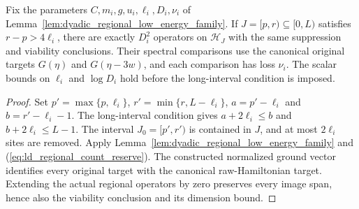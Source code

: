 \begin{lemma}
    \label{lem:dyadic_long_interval_low_energy_family}
    \leanok
    Fix the parameters $C,m_i,g,u_i,\ell_i,D_i,\nu_i$ of
    Lemma~\ref{lem:dyadic_regional_low_energy_family}. If
    $J=[p,r)\subseteq[0,L)$ satisfies $r-p>4\ell_i$, there are exactly
    $D_i^2$ operators on $\mathcal H_J$ with the same suppression and
    viability conclusions. Their spectral comparisons use the canonical
    original targets $G(\eta)$ and $G(\eta-3w)$, and each comparison
    has loss $\nu_i$. The scalar bounds on $\ell_i$ and $\log D_i$
    hold before the long-interval condition is imposed.
\end{lemma}
\begin{proof}\leanok
    Set $p'=\max\{p,\ell_i\}$, $r'=\min\{r,L-\ell_i\}$,
    $a=p'-\ell_i$ and $b=r'-\ell_i-1$. The long-interval condition gives
    $a+2\ell_i\le b$ and $b+2\ell_i\le L-1$.
    The interval $J_0=[p',r')$ is contained in $J$, and at most
    $2\ell_i$ sites are removed. Apply
    Lemma~\ref{lem:dyadic_regional_low_energy_family} and
    (\ref{eq:ld_regional_count_reserve}).
    The constructed normalized ground vector identifies every original
    target with the canonical raw-Hamiltonian target. Extending the
    actual regional operators by zero preserves every image span,
    hence also the viability conclusion and its dimension bound.
\end{proof}

